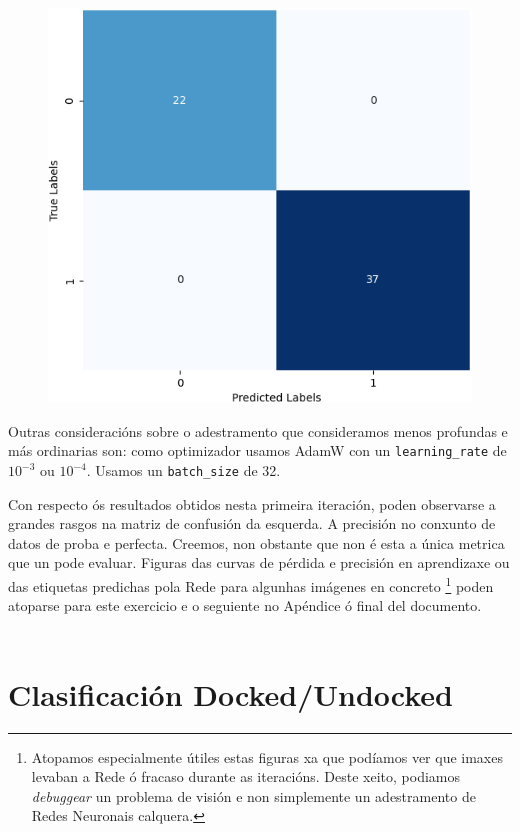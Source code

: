 \documentclass{article}
\begin{document}
\begin{figure}
	\includegraphics[width=1\linewidth]{cmEj1} 
	\label{fig:cmEj1}
\end{figure}


Outras consideracións sobre o adestramento que consideramos menos profundas e más ordinarias son: como optimizador usamos AdamW \cite{DBLP:journals/corr/abs-1711-05101} con un \texttt{learning\_rate} de $10^{-3}$ ou $10^{-4}$. Usamos un \texttt{batch\_size} de 32.

Con respecto ós resultados obtidos nesta primeira iteración, poden observarse a grandes rasgos na matriz de confusión da esquerda. A precisión no conxunto de datos de proba e perfecta. Creemos, non obstante que non é esta a única metrica que un pode evaluar. Figuras das curvas de pérdida e precisión en aprendizaxe ou das etiquetas predichas pola Rede para algunhas imágenes en concreto \footnote{Atopamos especialmente útiles estas figuras xa que podíamos ver que imaxes levaban a Rede ó fracaso durante as iteracións. Deste xeito, podiamos \emph{debuggear} un problema de visión e non simplemente un adestramento de Redes Neuronais calquera.} poden atoparse para este exercicio e o seguiente no Apéndice ó final del documento.  \\
\\
\newpage 
\section{Clasificación Docked/Undocked}
\end{document}
